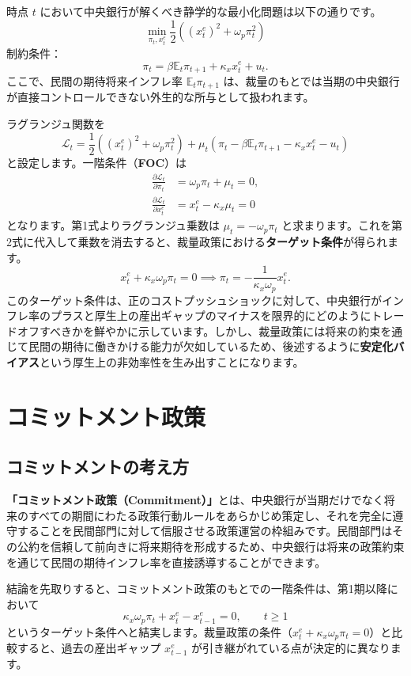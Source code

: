 \documentclass[
  japanese,
  lualatex,
  ja=standard,
  12pt,
  a4paper]{ltjsarticle}
\begin{document}
時点 \(t\)
において中央銀行が解くべき静学的な最小化問題は以下の通りです。 \[
\min_{\pi_t,x_t^e}
\frac{1}{2}
\left(
\left(x_t^e\right)^2+\omega_p\pi_t^2
\right)
\] 制約条件： \[
\pi_t
=
\beta\mathbb{E}_t\pi_{t+1}
+\kappa_x x_t^e
+u_t.
\] ここで、民間の期待将来インフレ率 \(\mathbb{E}_t\pi_{t+1}\)
は、裁量のもとでは当期の中央銀行が直接コントロールできない外生的な所与として扱われます。

ラグランジュ関数を \[
\mathcal{L}_t
=
\frac{1}{2}
\left(
\left(x_t^e\right)^2+\omega_p\pi_t^2
\right)
+\mu_t
\left(
\pi_t-\beta\mathbb{E}_t\pi_{t+1}-\kappa_x x_t^e-u_t
\right)
\] と設定します。一階条件（\textbf{FOC}）は \[
\begin{aligned}
\frac{\partial\mathcal{L}_t}{\partial \pi_t}
&=
\omega_p\pi_t+\mu_t=0,\\
\frac{\partial\mathcal{L}_t}{\partial x_t^e}
&=
x_t^e-\kappa_x\mu_t=0
\end{aligned}
\] となります。第1式よりラグランジュ乗数は \(\mu_t = -\omega_p\pi_t\)
と求まります。これを第2式に代入して乗数を消去すると、裁量政策における\textbf{ターゲット条件}が得られます。
\[
x_t^e+\kappa_x\omega_p\pi_t=0
\implies
\pi_t=-\frac{1}{\kappa_x\omega_p}x_t^e.
\]
このターゲット条件は、正のコストプッシュショックに対して、中央銀行がインフレ率のプラスと厚生上の産出ギャップのマイナスを限界的にどのようにトレードオフすべきかを鮮やかに示しています。しかし、裁量政策には将来の約束を通じて民間の期待に働きかける能力が欠如しているため、後述するように\textbf{安定化バイアス}という厚生上の非効率性を生み出すことになります。

\section{コミットメント政策}\label{ux30b3ux30dfux30c3ux30c8ux30e1ux30f3ux30c8ux653fux7b56}

\subsection{コミットメントの考え方}\label{ux30b3ux30dfux30c3ux30c8ux30e1ux30f3ux30c8ux306eux8003ux3048ux65b9}

\textbf{「コミットメント政策（Commitment）」}とは、中央銀行が当期だけでなく将来のすべての期間にわたる政策行動ルールをあらかじめ策定し、それを完全に遵守することを民間部門に対して信服させる政策運営の枠組みです。民間部門はその公約を信頼して前向きに将来期待を形成するため、中央銀行は将来の政策約束を通じて民間の期待インフレ率を直接誘導することができます。

結論を先取りすると、コミットメント政策のもとでの一階条件は、第1期以降において
\[
\kappa_x\omega_p\pi_t+x_t^e-x_{t-1}^e=0,
\qquad
t\geq1
\]
というターゲット条件へと結実します。裁量政策の条件（\(x_t^e + \kappa_x\omega_p\pi_t = 0\)）と比較すると、過去の産出ギャップ
\(x_{t-1}^e\) が引き継がれている点が決定的に異なります。
\end{document}
